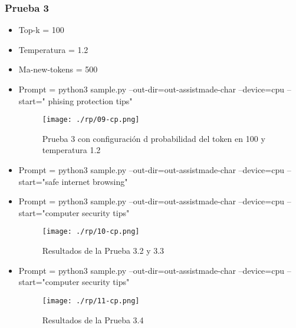 \subsubsection{ Prueba 3}\label{section:Prueba 3 mol 2}
\begin{itemize}
	\item   Top-k = 100
	\item   Temperatura = 1.2
	\item   Ma-new-tokens = 500
	\item   Prompt = python3 sample.py --out-dir=out-assistmade-char --device=cpu --start=" phising protection tips"
	\begin{figure}[H]
		\centering %
		\texttt{[image: ./rp/09-cp.png]} 
		\caption{Prueba 3 con configuración d probabilidad del token en 100 y temperatura 1.2}
		\label{figure:Result Prueba 3 mod 2}  %
	\end{figure}
	\item   Prompt = python3 sample.py --out-dir=out-assistmade-char --device=cpu --start="safe internet browsing"
	\item   Prompt = python3 sample.py --out-dir=out-assistmade-char --device=cpu --start="computer security tips"
	\begin{figure}[H]
		\centering %
		\texttt{[image: ./rp/10-cp.png]} 
		\caption{Resultados de la Prueba 3.2 y 3.3\cite{}}
		\label{figure:Resultado 3.2}  %
	\end{figure}
	\item   Prompt = python3 sample.py --out-dir=out-assistmade-char --device=cpu --start="computer security tips"
	\begin{figure}[H]
		\centering %
		\texttt{[image: ./rp/11-cp.png]} 
		\caption{Resultados de la Prueba 3.4\cite{}}
		\label{figure:Resultado 3.4}  %
	\end{figure}
\end{itemize}
